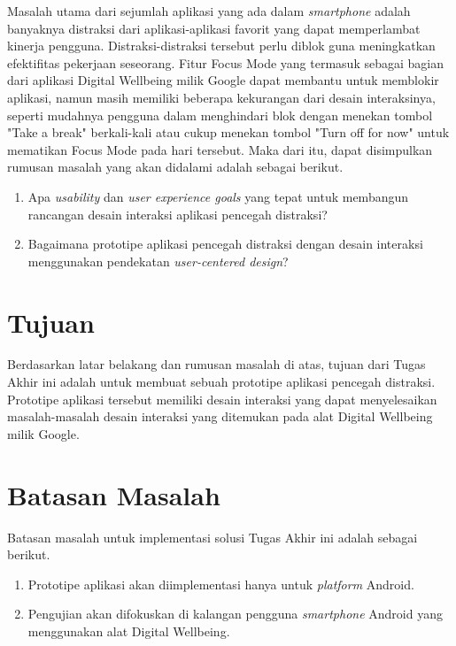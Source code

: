 Masalah utama dari sejumlah aplikasi yang ada dalam \emph{smartphone} adalah banyaknya distraksi dari aplikasi-aplikasi favorit yang dapat memperlambat kinerja pengguna. Distraksi-distraksi tersebut perlu diblok guna meningkatkan efektifitas pekerjaan seseorang. Fitur Focus Mode yang termasuk sebagai bagian dari aplikasi Digital Wellbeing milik Google dapat membantu untuk memblokir aplikasi, namun masih memiliki beberapa kekurangan dari desain interaksinya, seperti mudahnya pengguna dalam menghindari blok dengan menekan tombol "Take a break" berkali-kali atau cukup menekan tombol "Turn off for now" untuk mematikan Focus Mode pada hari tersebut. Maka dari itu, dapat disimpulkan rumusan masalah yang akan didalami adalah sebagai berikut.

\begin{enumerate}
  \item Apa \emph{usability} dan \emph{user experience goals} yang tepat untuk membangun rancangan desain interaksi aplikasi pencegah distraksi?
  \item Bagaimana prototipe aplikasi pencegah distraksi dengan desain interaksi menggunakan pendekatan \emph{user-centered design}?
\end{enumerate}

\section{Tujuan}

Berdasarkan latar belakang dan rumusan masalah di atas, tujuan dari Tugas Akhir ini adalah untuk membuat sebuah prototipe aplikasi pencegah distraksi. Prototipe aplikasi tersebut memiliki desain interaksi yang dapat menyelesaikan masalah-masalah desain interaksi yang ditemukan pada alat Digital Wellbeing milik Google.


\section{Batasan Masalah}

Batasan masalah untuk implementasi solusi Tugas Akhir ini adalah sebagai berikut.
\begin{enumerate}
  \item Prototipe aplikasi akan diimplementasi hanya untuk \textit{platform} Android.
  \item Pengujian akan difokuskan di kalangan pengguna \textit{smartphone} Android yang menggunakan alat Digital Wellbeing.
\end{enumerate}

